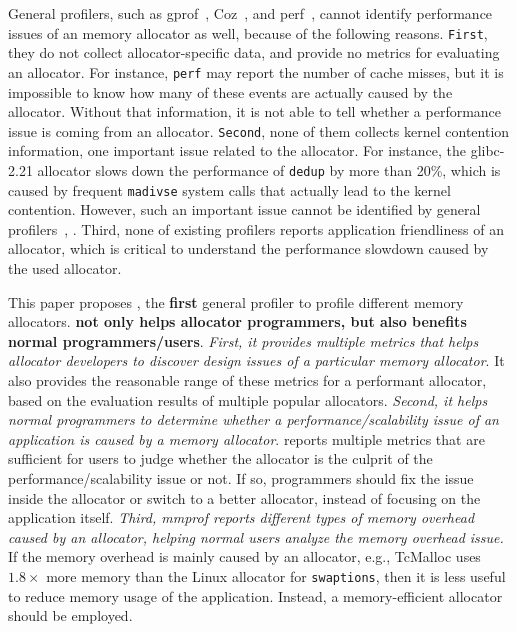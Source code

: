 General profilers, such as gprof~\citep{DBLP:conf/sigplan/GrahamKM82}, Coz~\citep{Coz}, and perf~\citep{perf}, cannot identify performance issues of an memory allocator as well, because of the following reasons. \texttt{First}, they do not collect allocator-specific data, and  provide no metrics for evaluating an allocator. For instance, \texttt{perf} may report the number of cache misses, but it is impossible to know how many of these events are actually caused by the allocator. Without that information, it is not able to tell whether a performance issue is coming from an allocator. \texttt{Second}, none of them collects kernel contention information, one important issue related to the allocator. For instance, the glibc-2.21 allocator slows down the performance of \texttt{dedup} by more than 20\%, which is caused by frequent \texttt{madivse} system calls that actually lead to the kernel contention. However, such an important issue cannot be identified by general profilers~\citep{DBLP:conf/sigplan/GrahamKM82, Coz, perf}, . Third, none of existing profilers reports application friendliness of an allocator, which is critical to understand the performance slowdown caused by the used allocator.   

This paper proposes \MP{}, the \textbf{first} general profiler to profile different memory allocators. \textbf{\MP{} not only helps allocator programmers, but also benefits normal programmers/users}. \textit{First, it provides multiple metrics that helps allocator developers to discover design issues of a particular memory allocator}. It also provides the reasonable range of these metrics for a performant allocator, based on the evaluation results of multiple popular allocators. \textit{Second, it helps normal programmers to determine whether a performance/scalability issue of an application is caused by a memory allocator}. \MP{} reports multiple metrics that are sufficient for users to judge whether the allocator is the culprit of the performance/scalability issue or not. If so,  programmers should fix the issue inside the allocator or switch to a better allocator, instead of focusing on the application itself. 
\textit{Third, mmprof reports different types of memory overhead caused by an allocator, helping normal users analyze the memory overhead issue.} 
If the memory overhead is mainly caused by an allocator, e.g., TcMalloc uses $1.8\times$ more memory than the Linux allocator for \texttt{swaptions}, then it is less useful to reduce memory usage of the application. Instead, a memory-efficient allocator should be employed.   


